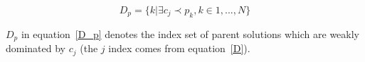\begin{equation}
\label{D_p}
D_p = \{k| \exists c_j \prec p_k, k \in {1,..., N}\}
\end{equation}

$D_p$ in equation~\ref{D_p} denotes the index set of parent solutions which are weakly dominated by $c_j$ (the $j$ index comes from equation~\ref{D}).












